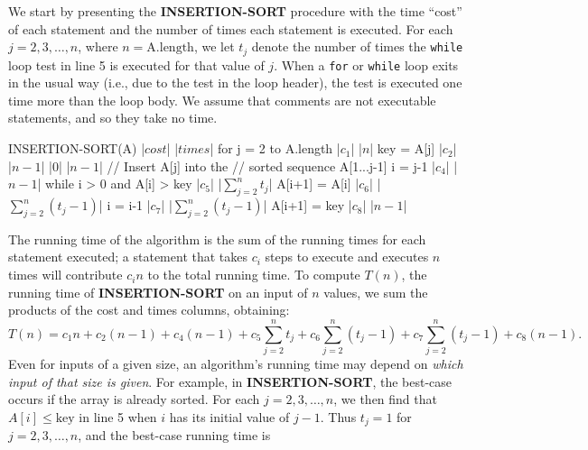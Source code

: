 \documentclass{report}
\begin{document}
    \bigbreak \noindent 
    We start by presenting the \textbf{INSERTION-SORT} procedure with the time ``cost'' of each statement and the number of times each statement is executed. For each \( j = 2, 3, \ldots, n \), where \( n = \text{A.length} \), we let \( t_j \) denote the number of times the \texttt{while} loop test in line 5 is executed for that value of \( j \). When a \texttt{for} or \texttt{while} loop exits in the usual way (i.e., due to the test in the loop header), the test is executed one time more than the loop body. We assume that comments are not executable statements, and so they take no time.

    \bigbreak \noindent 
    \begin{cppcode}
    INSERTION-SORT(A)                       |$cost$|    |$times$|
        for j = 2 to A.length               |$c_{1}$|       |$n$|
            key = A[j]                      |$c_{2}$|       |$n-1$| 
                                            |$0$|       |$n-1$|
            // Insert A[j] into the         
            // sorted sequence A[1...j-1]
            i = j-1                         |$c_{4}$|       |$n-1$|
            while i > 0 and A[i] > key      |$c_{5}$|       |$\sum_{j=2}^{n}t_{j}$|
                A[i+1] = A[i]               |$c_{6}$|       |$\sum_{j=2}^{n}(t_{j}-1)$|
                i = i-1                     |$c_{7}$|       |$\sum_{j=2}^{n}(t_{j}-1)$|
            A[i+1] = key                    |$c_{8}$|       |$n-1$|
    \end{cppcode}
    \bigbreak \noindent 
    The running time of the algorithm is the sum of the running times for each statement executed; a statement that takes \( c_i \) steps to execute and executes \( n \) times will contribute \( c_i n \) to the total running time.
    \bigbreak \noindent 
    To compute \( T(n) \), the running time of \textbf{INSERTION-SORT} on an input of \( n \) values, we sum the products of the cost and times columns, obtaining:
    \bigbreak \noindent 
    \[
        T(n) = c_1 n + c_2 (n - 1) + c_4 (n - 1) + c_5 \sum_{j=2}^{n} t_j + c_6 \sum_{j=2}^{n} (t_j - 1)
        + c_7 \sum_{j=2}^{n} (t_j - 1) + c_8 (n - 1).
    \]
    Even for inputs of a given size, an algorithm’s running time may depend on \textit{which input of that size is given}. For example, in \textbf{INSERTION-SORT}, the best-case occurs if the array is already sorted. For each \( j = 2, 3, \ldots, n \), we then find that \( A[i] \leq \text{key} \) in line 5 when \( i \) has its initial value of \( j - 1 \). Thus \( t_j = 1 \) for \( j = 2, 3, \ldots, n \), and the best-case running time is
\end{document}
